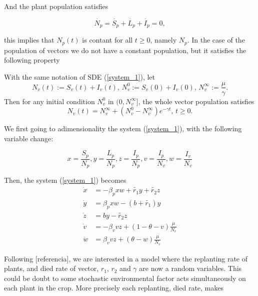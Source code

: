 And the plant population satisfies

\begin{equation*}
	\dot{N_p} = \dot{S_p}+\dot{L_p}+\dot{I_p}=0,
\end{equation*}

this implies that $N_p(t)$ is contant for all $t\geq 0$, namely $N_p$. In the case of the population of vectors we do not have a constant population, but it satisfies the following property

\begin{theorem}\label{theorem_1}
	With the same notation of SDE (\ref{system_1}), let
	\begin{equation*}
	N_v(t) := S_v(t) + I_v(t),\, N_v^0 := S_v(0) + I_v(0),\, N_v^{\infty} := \frac{\mu}{\gamma}.
	\end{equation*}
	Then for any initial condition $N_v^0$ in $(0, N^\infty_v]$, the whole vector population satisfies
	\begin{equation*}
	N_v(t) = N^\infty_v +(N^0_v-N^\infty_v)e^{-\gamma t},\, t\geq 0.
	\end{equation*}
\end{theorem}

We first going to adimensionality the system (\ref{system_1}), with the following variable change:

\begin{equation*}
	x=\frac{S_p}{N_p}, y=\frac{L_p}{N_p}, z=\frac{I_p}{N_p}, v=\frac{I_p}{N_v}, w=\frac{I_v}{N_v}
\end{equation*}

Then, the system (\ref{system_1}) becomes
\begin{equation}\label{system_2}
	\begin{aligned}
	\dot{x} &=
		-\beta_p x w + \tilde{r_1} y + \tilde{r_2} z \\
	\dot{y} &=
		\beta_p x w - (b + \tilde{r_1}) y \\
	\dot{z} &=
		b y - \tilde{r_2} z \\
	\dot{v} &=
		-\beta_v v z  +(1-\theta-v)\frac{\mu}{N_v} \\
	\dot{w} &=
		\beta_v v z + (\theta-w) \frac{\mu}{N_v}
	\end{aligned}
\end{equation}

Following [referencia], we are interested in a model where the replanting rate of plants, and died rate of vector, $r_1$, $r_2$ and $\gamma$ are now a random variables. This could be doubt to some stochastic environmental factor acts simultaneously on each plant in the crop. More precisely each replanting, died rate, makes

